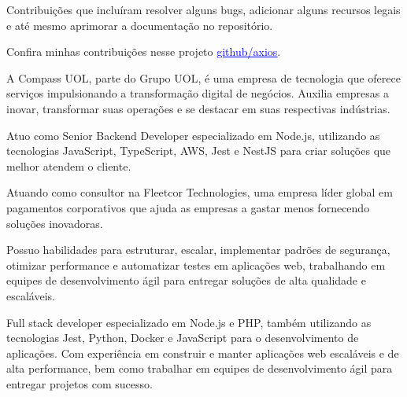 \documentclass[10pt,a4paper,ragged2e,withhyper]{altacv}
\begin{document}
\begin{paracol}{2}


Contribuições que incluíram resolver alguns bugs, adicionar alguns recursos legais e até mesmo aprimorar a documentação no repositório.


Confira minhas contribuições nesse projeto \href{https://github.com/axios/axios/issues?q=commenter%3AWillianAgostini}{\textcolor{blue}{\underline{github/axios}}}.



A Compass UOL, parte do Grupo UOL, é uma empresa de tecnologia que oferece serviços impulsionando a
transformação digital de negócios. Auxilia empresas a inovar, transformar suas operações e se destacar
em suas respectivas indústrias.

\vspace{0.2cm}Atuo como Senior Backend Developer especializado em Node.js, utilizando as tecnologias JavaScript, TypeScript, AWS, Jest e NestJS para criar soluções que melhor atendem o cliente.

\vspace{0.2cm} Atuando como consultor na Fleetcor Technologies, uma empresa líder global em pagamentos corporativos que ajuda as empresas a gastar menos fornecendo soluções inovadoras.

\vspace{0.2cm} Possuo habilidades para estruturar, escalar, implementar padrões de segurança, otimizar performance e automatizar testes em aplicações web, trabalhando em equipes de desenvolvimento ágil para entregar soluções de alta qualidade e escaláveis.

\divider

Full stack developer especializado em Node.js e PHP, também utilizando as tecnologias Jest, Python, Docker e JavaScript para o desenvolvimento de aplicações. Com experiência em construir e manter aplicações web escaláveis e de alta performance, bem como trabalhar em equipes de desenvolvimento ágil para entregar projetos com sucesso.



\end{paracol}
\end{document}
